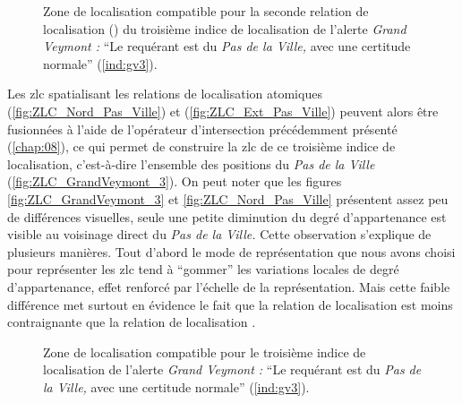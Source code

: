 \begin{figure}
  \centering
  
  \caption{Zone de localisation compatible pour la seconde relation de
    localisation (\protect{})
    du troisième indice de localisation de l'alerte \emph{Grand
      Veymont :} \enquote{Le requérant est
      \protect{} du \emph{Pas de la
        Ville,} avec une certitude normale} (\ref{ind:gv3}).}
  \label{fig:ZLC_Ext_Pas_Ville}
\end{figure}

Les \ac{zlc} spatialisant les relations de localisation atomiques
 (\autoref{fig:ZLC_Nord_Pas_Ville}) et
(\autoref{fig:ZLC_Ext_Pas_Ville}) peuvent alors être fusionnées à
l'aide de l'opérateur d'intersection précédemment présenté
(\autoref{chap:08}), ce qui permet de construire la \ac{zlc} de ce
troisième indice de localisation, c'est-à-dire l'ensemble des
positions  du \emph{Pas de la Ville}
(\autoref{fig:ZLC_GrandVeymont_3}). On peut noter que les figures
\autoref{fig:ZLC_GrandVeymont_3} et \autoref{fig:ZLC_Nord_Pas_Ville}
présentent assez peu de différences visuelles, seule une petite
diminution du degré d'appartenance est visible au voisinage direct du
\emph{Pas de la Ville.} Cette observation s'explique de plusieurs
manières. Tout d'abord le mode de représentation que nous avons choisi
pour représenter les \ac{zlc} tend à \enquote{gommer} les variations
locales de degré d'appartenance, effet renforcé par l'échelle de la
représentation. Mais cette faible différence met surtout en évidence
le fait que la relation de localisation
 est moins contraignante que
la relation de localisation .

\begin{figure}
  \centering
  
  \caption{Zone de localisation compatible pour le troisième indice de
    localisation de l'alerte \emph{Grand Veymont :} \enquote{Le
      requérant est \protect{} du
      \emph{Pas de la Ville,} avec une certitude normale}
    (\ref{ind:gv3}).}
  \label{fig:ZLC_GrandVeymont_3}
\end{figure}




